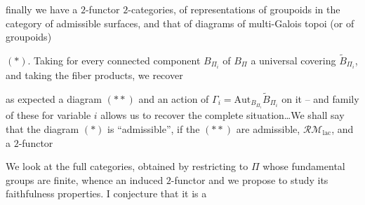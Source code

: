  finally we have a $2$-functor   $2$-categories,  of representations of groupoids in the category of admissible surfaces, and that of diagrams of multi-Galois topoi (or of groupoids)

$(*)$. Taking for every connected component $B_{\Pi_i}$ of $B_\Pi$ a universal covering $\widetilde B_{\Pi_i}$, and taking the fiber products, we recover

as expected a diagram
$(**)$
and an action of $\Gamma_i=\mathrm{Aut}_{B_{\Pi_i}}\widetilde B_{\Pi_i}$ on it -- and   family of these for variable $i$ allows us to recover the complete situation\ldots We shall say that the diagram $(*)$ is ``admissible'', if the  $(**)$ are admissible,     $\mathcal{RM}_{\mathrm{lac}}$, and a $2$-functor

We look at the  full categories, obtained by restricting to $\Pi$ whose fundamental groups are finite, whence an induced $2$-functor
and we propose to study its faithfulness properties. I conjecture that it is a